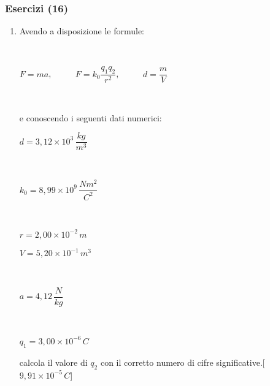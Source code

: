 \documentclass[]{beamer}
\begin{document}
\begin{frame}
\frametitle{Esercizi (16)}
\begin{enumerate}
  \item Avendo a disposizione le formule:
  
  ~

  \begin{center}
    $ F = ma $, ~~~~~$ F = k_0 \dfrac{q_1 q_2}{r^2} $,~~~~~ $ d = \dfrac{m}{V} $
  \end{center}

  ~

  e conoscendo i seguenti dati numerici:
  \begin{multicols}{2}
    $ d = 3,12 \times 10^{3} \, \dfrac{kg}{m^3}  $

    ~

    $ k_0 = 8,99 \times 10^{9} \, \dfrac{Nm^2}{C^2} $

    ~

    $ r = 2,00 \times 10^{-2} \, m $

    $ V = 5,20 \times 10^{-1} \, m^3 $

    ~

    $ a = 4,12 \, \dfrac{N}{kg} $

    ~

    $ q_1 = 3,00 \times 10^{-6} \, C $
  \end{multicols}
  calcola il valore di $ q_2 $ con il corretto numero di cifre significative.\hspace{\fill}[$ 9,91 \times 10^{-5} \, C $]
\end{enumerate}
\end{frame}
\end{document}
